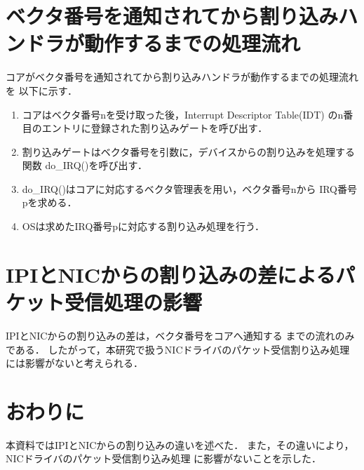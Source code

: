 \documentclass[12pt]{jsarticle}
\begin{document}
\section{ベクタ番号を通知されてから割り込みハンドラが動作するまでの処理流れ}
コアがベクタ番号を通知されてから割り込みハンドラが動作するまでの処理流れを
以下に示す．
\begin{enumerate}
    \item
        コアはベクタ番号nを受け取った後，Interrupt Descriptor Table(IDT) 
        のn番目のエントリに登録された割り込みゲートを呼び出す．
    \item 
        割り込みゲートはベクタ番号を引数に，デバイスからの割り込みを処理する
        関数 do\_IRQ()を呼び出す．
    \item 
        do\_IRQ()はコアに対応するベクタ管理表を用い，ベクタ番号nから
        IRQ番号pを求める．
    \item
        OSは求めたIRQ番号pに対応する割り込み処理を行う．
\end{enumerate}
\section{IPIとNICからの割り込みの差によるパケット受信処理の影響}
IPIとNICからの割り込みの差は，ベクタ番号をコアへ通知する
までの流れのみである．
したがって，本研究で扱うNICドライバのパケット受信割り込み処理
には影響がないと考えられる．
\section{おわりに}
本資料ではIPIとNICからの割り込みの違いを述べた．
また，その違いにより，NICドライバのパケット受信割り込み処理
に影響がないことを示した．
\end{document}

